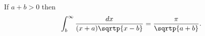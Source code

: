 If $a + b > 0$ then
\[
\int_{b}^{\infty} \frac{dx}{(x + a)\sqrtp{x - b}} = \frac{\pi}{\sqrtp{a + b}}.
\]

